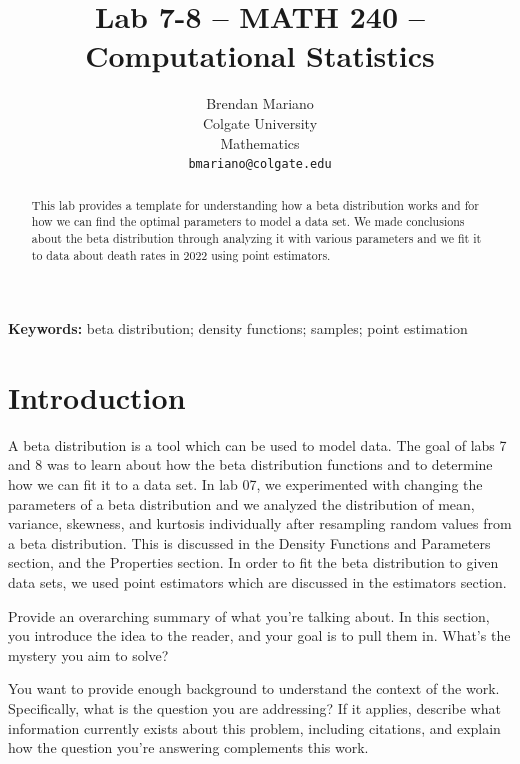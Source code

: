 \documentclass{article}\usepackage[]{graphicx}\usepackage[]{xcolor}
\begin{document}
\vspace{-1in}
\title{Lab 7-8 -- MATH 240 -- Computational Statistics}

\author{
  Brendan Mariano \\
  Colgate University  \\
  Mathematics  \\
  {\tt bmariano@colgate.edu}
}

\date{}

\maketitle

\begin{multicols}{2}
\begin{abstract}
This lab provides a template for understanding how a beta distribution works and for how we can find the optimal parameters to model a data set. We made conclusions about the beta distribution through analyzing it with various parameters and we fit it to data about death rates in 2022 using point estimators.

\end{abstract}

\noindent \textbf{Keywords:} beta distribution; density functions; samples; point estimation

\section{Introduction}
A beta distribution is a tool which can be used to model data. The goal of labs 7 and 8 was to learn about how the beta distribution functions and to determine how we can fit it to a data set. In lab 07, we experimented with changing the parameters of a beta distribution and we analyzed the distribution of mean, variance, skewness, and kurtosis individually after resampling random values from a beta distribution. This is discussed in the Density Functions and Parameters section, and the Properties section. In order to fit the beta distribution to given data sets, we used point estimators which are discussed in the estimators section. 


Provide an overarching summary of what you're talking about. In this section, you introduce the idea to the reader, and your goal is to pull them in. What's the mystery you aim to solve?

You want to provide enough background to understand the context of the work. Specifically, what is the question you are addressing? If it applies, describe what information currently exists about this problem, including citations, and explain how the question you're answering complements this work.


\end{multicols}
\end{document}
